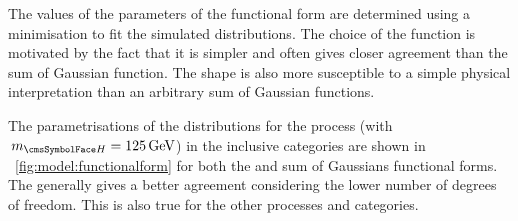 The values of the parameters of the functional form are determined using a \NLL minimisation to fit the simulated \mgg distributions.
The choice of the \DCBpG function is motivated by the fact that it is simpler and often gives closer agreement than the sum of Gaussian function. %
The \DCB shape is also more susceptible to a simple physical interpretation than an arbitrary sum of Gaussian functions. 

The parametrisations of the \mgg distributions for the \ggH process (with $\mH=125\GeV$) in the inclusive categories are shown in \Fig~\ref{fig:model:functionalform} for both the \DCBpG and sum of Gaussians functional forms. %
The \DCBpG generally gives a better agreement considering the lower number of degrees of freedom. This is also true for the other processes and categories.


